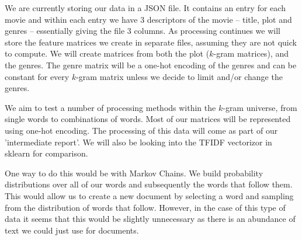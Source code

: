 \documentclass[12pt]{article}
\begin{document}
We are currently storing our data in a JSON file. It contains an entry for each movie and within each entry we have 3 descriptors of the movie -- title, plot and genres -- essentially giving the file 3 columns. As processing continues we will store the feature matrices we create in separate files, assuming they are not quick to compute. We will create matrices from both the plot ($k$-gram matrices), and the genres. The genre matrix will be a one-hot encoding of the genres and can be constant for every $k$-gram matrix unless we decide to limit and/or change the genres.


We aim to test a number of processing methods within the $k$-gram universe, from single words to combinations of words. Most of our matrices will be represented using one-hot encoding. The processing of this data will come as part of our 'intermediate report'. We will also be looking into the TFIDF vectorizor in sklearn for comparison.

One way to do this would be with Markov Chains. We build probability distributions over all of our words and subsequently the words that follow them. This would allow us to create a new document by selecting a word and sampling from the distribution of words that follow. However, in the case of this type of data it seems that this would be slightly unnecessary as there is an abundance of text we could just use for documents.
\end{document}
